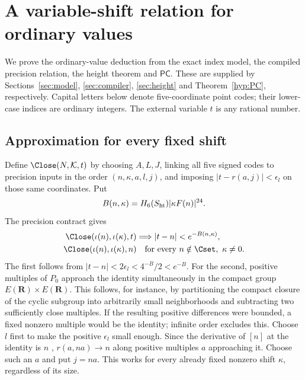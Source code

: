 \section{A variable-shift relation for ordinary values}\label{sec:bridge}
We prove the ordinary-value deduction from the exact index model,
the compiled precision relation, the height theorem and $\mathsf{PC}$.
These are supplied by Sections~\ref{sec:model}, \ref{sec:compiler},
\ref{sec:height} and Theorem~\ref{hyp:PC}, respectively. Capital letters below denote five-coordinate point codes;
their lower-case indices are ordinary integers. The external variable
$t$ is any rational number.

\subsection{Approximation for every fixed shift}
Define $\Close(N,\mathcal K,t)$ by choosing $A,L,J$, linking all five
signed codes to precision inputs in the order $(n,\kappa,a,l,j)$, and
imposing $|t-r(a,j)|<\epsilon_l$ on those same coordinates. Put
\[
 B(n,\kappa)=H_6(S_{\rm ht})|\kappa F(n)|^{24}.
\]
The precision contract gives
\begin{align}
 \Close(\iota(n),\iota(\kappa),t)&\Longrightarrow
                  |t-n|<e^{-B(n,\kappa)},\label{eq:close-sound}\\
 \Close(\iota(n),\iota(\kappa),n)&\quad\text{for every }
                  n\notin\Cset,\ \kappa\ne0.\label{eq:close-complete}
\end{align}
The first follows from $|t-n|<2\epsilon_l<4^{-B}/2<e^{-B}$.
For the second, positive multiples of $P_0$ approach the identity
simultaneously in the compact group $E(\mathbf R)\times E(\mathbf R)$.
This follows, for instance, by partitioning the compact closure of the
cyclic subgroup into arbitrarily small neighborhoods and subtracting
two sufficiently close multiples. If the resulting positive differences
were bounded, a fixed nonzero multiple would be the identity; infinite
order excludes this. Choose $l$ first to make the positive $\epsilon_l$
small enough. Since the derivative of $[n]$ at the identity is $n$
\cite[IV.2.3(a), p.~122]{silverman},
$r(a,na)\to n$ along positive multiples $a$ approaching it. Choose such
an $a$ and put $j=na$. This works for every already fixed nonzero shift
$\kappa$, regardless of its size.

